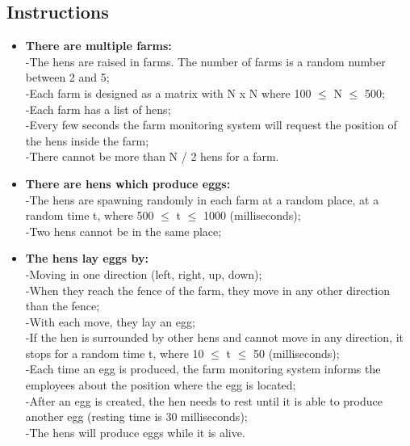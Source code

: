 \documentclass{article}
\begin{document}
\subsection{Instructions}
\begin{itemize}
\item \textbf{There are multiple farms:}  \\
-The hens are raised in farms. The number of farms is a random number between 2 and 5;\\ 
-Each farm is designed as a matrix with N x N where 100 $\le$ N $\le$ 500;\\ 
-Each farm has a list of hens;\\ 
-Every few seconds the farm monitoring system will request the position of the hens
inside the farm;\\ 
-There cannot be more than N / 2 hens for a farm.


\item \textbf{There are hens which produce eggs:}  \\
-The hens are spawning randomly in each farm at a random place, at a random time t,
where 500 $\le$ t $\le$ 1000 (milliseconds); \\ 
-Two hens cannot be in the same place;\\
\item \textbf{The hens lay eggs by:} \\ 
-Moving in one direction (left, right, up, down); \\ 
-When they reach the fence of the farm, they move in any other direction than the
fence; \\
-With each move, they lay an egg; \\
-If the hen is surrounded by other hens and cannot move in any direction, it stops for a
random time t, where 10 $\le$ t $\le$ 50 (milliseconds);\\
-Each time an egg is produced, the farm monitoring system informs the employees
about the position where the egg is located; \\
-After an egg is created, the hen needs to rest until it is able to produce another egg
(resting time is 30 milliseconds); \\
-The hens will produce eggs while it is alive. \\ \\



\end{itemize}
\end{document}
